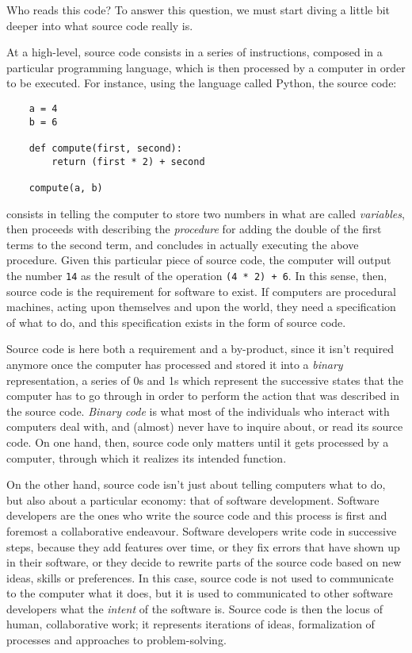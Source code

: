 Who reads this code? To answer this question, we must start diving a little bit deeper into what source code really is.

At a high-level, source code consists in a series of instructions, composed in a particular programming language, which is then processed by a computer in order to be executed. For instance, using the language called Python, the source code:

\begin{lstlisting}
    a = 4
    b = 6

    def compute(first, second):
        return (first * 2) + second
    
    compute(a, b)
\end{lstlisting}

consists in telling the computer to store two numbers in what are called \emph{variables}, then proceeds with describing the \emph{procedure} for adding the double of the first terms to the second term, and concludes in actually executing the above procedure. Given this particular piece of source code, the computer will output the number \lstinline{14} as the result of the operation \lstinline{(4 * 2) + 6}. In this sense, then, source code is the requirement for software to exist. If computers are procedural machines, acting upon themselves and upon the world, they need a specification of what to do, and this specification exists in the form of source code.

Source code is here both a requirement and a by-product, since it isn't required anymore once the computer has processed and stored it into a \emph{binary} representation, a series of 0s and 1s which represent the successive states that the computer has to go through in order to perform the action that was described in the source code. \emph{Binary code} is what most of the individuals who interact with computers deal with, and (almost) never have to inquire about, or read its source code. On one hand, then, source code only matters until it gets processed by a computer, through which it realizes its intended function.

On the other hand, source code isn't just about telling computers what to do, but also about a particular economy: that of software development. Software developers are the ones who write the source code and this process is first and foremost a collaborative endeavour. Software developers write code in successive steps, because they add features over time, or they fix errors that have shown up in their software, or they decide to rewrite parts of the source code based on new ideas, skills or preferences. In this case, source code is not used to communicate to the computer what it does, but it is used to communicated to other software developers what the \emph{intent} of the software is. Source code is then the locus of human, collaborative work; it represents iterations of ideas, formalization of processes and approaches to problem-solving.

